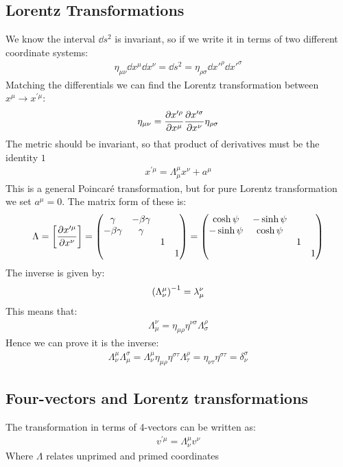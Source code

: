 \documentclass[12pt]{article}
\begin{document}
\subsection{Lorentz Transformations}
We know the interval $\dd{s}^2$ is invariant, so if we write it in terms of two different coordinate systems:
\begin{align*}
  \eta_{\mu\nu}\dd{x}^\mu\dd{x}^\nu=\dd{s^2}=
  \eta_{\rho\sigma}\dd{x'}^\rho\dd{x'}^\sigma
\end{align*}
Matching the differentials we can find the Lorentz transformation between $x^\mu\to x^{\prime\mu}$:
\begin{align*}
  \eta_{\mu\nu}=\pdv{x^{\prime\rho}}{x^\mu}\pdv{x^{\prime\sigma}}{x^\nu}
  \eta_{\rho\sigma}
\end{align*}
The metric should be invariant, so that product of derivatives must be the identity $1$
\begin{align*}
  x^{\prime\mu}=\Lambda^\mu_\mu x^\nu+a^\mu
\end{align*}
This is a general Poincar\'{e} transformation, but for pure Lorentz transformation we set $a^\mu=0$. The matrix form of these is:
\begin{align*}
  \Lambda= \qty[\pdv{x^{\prime\mu}}{x^\nu}]=
  \pmqty{\gamma&-\beta\gamma \\ -\beta\gamma&\gamma \\&&1&\\ &&&1}=
  \pmqty{\cosh\psi&-\sinh\psi\\-\sinh\psi&\cosh\psi\\ &&1&\\ &&&1}
\end{align*}
The inverse is given by:
\begin{align*}
  \qty(\Lambda^\mu_\nu)^{-1}=\lambda_\mu^\nu
\end{align*}
This means that:
\begin{align*}
  \Lambda_\mu^\nu=\eta_{\mu\rho}\eta^{\nu\sigma}\Lambda^\rho_\sigma
\end{align*}
Hence we can prove it is the inverse:
\begin{align*}
  \Lambda^\mu_\nu\Lambda_\mu^\sigma=\Lambda^\mu_\nu\eta_{\mu\rho}\eta^{\sigma\tau}
  \Lambda^{\rho}_\tau=\eta_{\nu\tau}\eta^{\sigma\tau}=\delta^\sigma_\nu
\end{align*}
\subsection{Four-vectors and Lorentz transformations}
The transformation in terms of 4-vectors can be written as:
\begin{align*}
  v^{\prime\mu}=\Lambda^\mu_\nu v^\nu
\end{align*}
Where $\Lambda$ relates unprimed and primed coordinates
\end{document}

